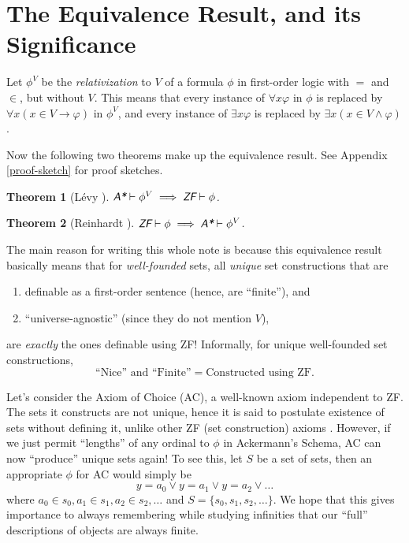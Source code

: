 \documentclass{article}
\newtheorem{theorem}{Theorem}[section]
\begin{document}
\section{The Equivalence Result, and its Significance}
Let $\phi^V$ be the \textit{relativization} to $V$ of a formula $\phi$ in first-order logic with $=$ and $\in$, but without $V$. This means that every instance of $\forall x \varphi$ in $\phi$ is replaced by $\forall x (x \in V \rightarrow \varphi)$ in $\phi^V$, and every instance of $\exists x \varphi$ is replaced by $\exists x (x \in V \wedge \varphi)$.

Now the following two theorems make up the equivalence result. See Appendix \ref{proof-sketch} for proof sketches.

\begin{theorem}[Lévy \cite{levy}]\label{levy-thm}
	$\emph{\textsf{A*}}\vdash\phi^V \implies \emph{\textsf{ZF}}\vdash\phi$.
\end{theorem}
\begin{theorem}[Reinhardt \cite{reinhardt}]\label{reinhardt-thm}
	$\emph{\textsf{ZF}}\vdash\phi \implies \emph{\textsf{A*}}\vdash\phi^V$.
\end{theorem}

\noindent The main reason for writing this whole note is because this equivalence result basically means that for \textit{well-founded} sets, all \textit{unique} set constructions that are
\begin{enumerate}
	\item definable as a first-order sentence (hence, are ``finite''), and
	\item ``universe-agnostic'' (since they do not mention $V$),
\end{enumerate}
are \textit{exactly} the ones definable using ZF! Informally, for unique well-founded set constructions, $$\text{``Nice'' and ``Finite''} = \text{Constructed using ZF}.$$

Let's consider the Axiom of Choice (AC), a well-known axiom independent to ZF. The sets it constructs are not unique, hence it is said to postulate existence of sets without defining it, unlike other ZF (set construction) axioms \cite[Chapter 5]{jech}. However, if we just permit ``lengths'' of any ordinal to $\phi$ in Ackermann's Schema, AC can now ``produce'' unique sets again! To see this, let $S$ be a set of sets, then an appropriate $\phi$ for AC would simply be $$y = a_0 \vee y = a_1 \vee y = a_2 \vee \ldots$$ where $a_0 \in s_0, a_1 \in s_1, a_2 \in s_2, \ldots$ and $S=\{s_0, s_1, s_2, \ldots\}$. We hope that this gives importance to always remembering while studying infinities that our ``full'' descriptions of objects are always finite.
\end{document}
